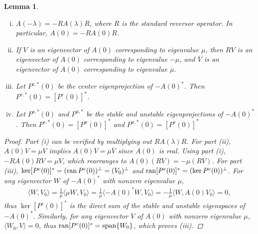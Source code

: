 \documentclass[10pt,reqno]{amsart}
\theoremstyle{plain}
\newtheorem{lemma}[theorem]{Lemma}
\theoremstyle{definition}
\theoremstyle{remark}
\numberwithin{theorem}{section}
\numberwithin{equation}{section}
\begin{document}
\begin{lemma}\label{lemma:Afacts}\leavevmode
\begin{enumerate}[(i)]
	\item $A(-\lambda) = -R A(\lambda)R$, where $R$ is the standard reversor operator. In particular, $A(0) = -R A(0)R$.
	\item If $V$ is an eigenvector of $A(0)$ corresponding to eigenvalue $\mu$, then $RV$ is an eigenvector of $A(0)$ corresponding to eigenvalue $-\mu$, and $\overline{V}$ is an eigenvector of $A(0)$ corresponding to eigenvalue $\overline{\mu}$. 
	\item Let $P^{c,*}(0)$ be the center eigenprojection of $-A(0)^*$. Then $P^{c,*}(0) = [P^c(0)]^*$. 
	\item Let $P^{s,*}(0)$ and $P^{u,*}$ be the stable and unstable eigenprojections of $-A(0)^*$. Then $P^{s,*}(0) = [P^u(0)]^*$ and $P^{u,*}(0) = [P^s(0)]^*$
\end{enumerate}	
\begin{proof}
Part (i) can be verified by multiplying out $R A(\lambda)R$. For part (ii), $A(0)V = \mu V$ implies $A(0)\overline{V} = \overline{\mu}\overline{V}$ since $A(0)$ is real. Using part (i), $-R A(0) R V = \mu V$, which rearranges to $A(0) (RV) = -\mu(RV)$. For part (iii), $\mathop\mathrm{ker}\nolimits [P^c(0)]^* = (\operatorname{ran} P^c(0))^\perp = (V_0)^\perp$  and $\operatorname{ran} [P^c(0)]^* = (\mathop\mathrm{ker}\nolimits P^c(0))^\perp$. For any eigenvector $W$ of $-A(0)^*$ with nonzero eigenvalue $\mu$,
\begin{align*}
\langle W, V_0 \rangle = \frac{1}{\overline{\mu}} \langle \mu W, V_0 \rangle
= \frac{1}{\overline{\mu}}\langle -A(0)^* W, V_0 \rangle = -\frac{1}{\overline{\mu}}\langle W, A(0) V_0 \rangle = 0,
\end{align*}
thus $\ker [P^c(0)]^*$ is the direct sum of the stable and unstable eigenspaces of $-A(0)^*$. Similarly, for any eigenvector $V$ of $A(0)$ with nonzero eigenvalue $\mu$, $\langle W_0, V \rangle = 0$, thus $\operatorname{ran} [P^c(0)]^* = \operatorname{span}\{W_0\}$, which proves (iii).


\end{proof}
\end{lemma}
\end{document}
